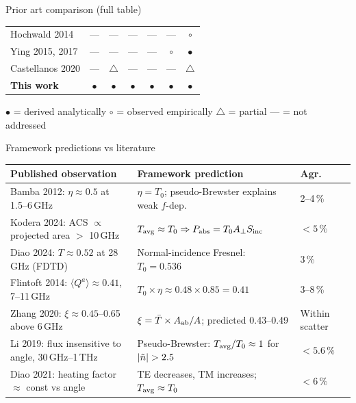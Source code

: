 \begin{frame}[label=app-lit-table]{Prior art comparison (full table)}
{\begin{tabular}{l cccccc}
    Hochwald 2014       & ---     & ---         & ---         & ---   & ---     & $\circ$ \\
    Ying 2015, 2017     & ---     & ---         & ---         & ---   & $\circ$ & $\bullet$ \\
    Castellanos 2020    & ---     & $\triangle$ & ---         & ---   & ---     & $\triangle$ \\
    \midrule
    \textbf{This work}   & $\bullet$ & $\bullet$ & $\bullet$   & $\bullet$ & $\bullet$ & $\bullet$ \\
    \bottomrule
  \end{tabular}
  }

  \vspace{4pt}
  {\tiny
    $\bullet$ = derived analytically \quad $\circ$ = observed empirically \quad
    $\triangle$ = partial \quad --- = not addressed
  }

  \vspace{2pt}
  \quad{}
\end{frame}

\begin{frame}[label=app-lit-predictions]{Framework predictions vs literature}

  {\scriptsize
  \begin{tabularx}{\textwidth}{XXl}
    \toprule
    Published observation & Framework prediction & Agr. \\
    \midrule
    Bamba 2012: $\eta \approx 0.5$ at 1.5--6\,GHz
    & $\eta = T_0$; pseudo-Brewster explains weak $f$-dep.
    & 2--4\,\% \\[3pt]
    Kodera 2024: ACS $\propto$ projected area $>$ 10\,GHz
    & $T_{\mathrm{avg}} \approx T_0 \Rightarrow P_{\mathrm{abs}} = T_0 A_{\perp} S_{\mathrm{inc}}$
    & $<5\,\%$ \\[3pt]
    Diao 2024: $T \approx 0.52$ at 28\,GHz (FDTD)
    & Normal-incidence Fresnel: $T_0 = 0.536$
    & 3\,\% \\[3pt]
    Flintoft 2014: $\langle Q^a\rangle \approx 0.41$, 7--11\,GHz
    & $T_0 \times \eta \approx 0.48 \times 0.85 = 0.41$
    & 3--8\,\% \\[3pt]
    Zhang 2020: $\xi \approx 0.45$--0.65 above 6\,GHz
    & $\xi = \bar{T} \times A_{\mathrm{ab}}/A$; predicted 0.43--0.49
    & Within scatter \\[3pt]
    Li 2019: flux insensitive to angle, 30\,GHz--1\,THz
    & Pseudo-Brewster: $T_{\mathrm{avg}}/T_0 \approx 1$ for $|\ntilde|>2.5$
    & $< 5.6\,\%$ \\[3pt]
    Diao 2021: heating factor $\approx$ const vs angle
    & TE decreases, TM increases; $T_{\mathrm{avg}} \approx T_0$
    & $<6\,\%$ \\
    \bottomrule
  \end{tabularx}
  }

  \vspace{4pt}
\end{frame}

